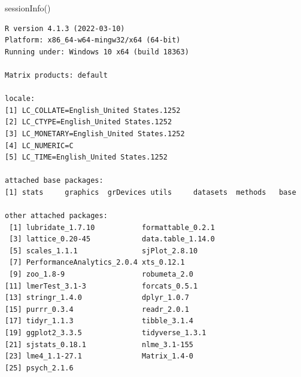\documentclass[
  11pt,
]{book}
\newenvironment{Shaded}{\begin{snugshade}}{\end{snugshade}}
\newcommand{\FunctionTok}[1]{\textcolor[rgb]{0.00,0.00,0.00}{#1}}
\newcommand{\NormalTok}[1]{#1}
\begin{document}
\begin{Shaded}
\begin{Highlighting}[]
\FunctionTok{sessionInfo}\NormalTok{()}
\end{Highlighting}
\end{Shaded}

\begin{verbatim}
R version 4.1.3 (2022-03-10)
Platform: x86_64-w64-mingw32/x64 (64-bit)
Running under: Windows 10 x64 (build 18363)

Matrix products: default

locale:
[1] LC_COLLATE=English_United States.1252 
[2] LC_CTYPE=English_United States.1252   
[3] LC_MONETARY=English_United States.1252
[4] LC_NUMERIC=C                          
[5] LC_TIME=English_United States.1252    

attached base packages:
[1] stats     graphics  grDevices utils     datasets  methods   base     

other attached packages:
 [1] lubridate_1.7.10           formattable_0.2.1         
 [3] lattice_0.20-45            data.table_1.14.0         
 [5] scales_1.1.1               sjPlot_2.8.10             
 [7] PerformanceAnalytics_2.0.4 xts_0.12.1                
 [9] zoo_1.8-9                  robumeta_2.0              
[11] lmerTest_3.1-3             forcats_0.5.1             
[13] stringr_1.4.0              dplyr_1.0.7               
[15] purrr_0.3.4                readr_2.0.1               
[17] tidyr_1.1.3                tibble_3.1.4              
[19] ggplot2_3.3.5              tidyverse_1.3.1           
[21] sjstats_0.18.1             nlme_3.1-155              
[23] lme4_1.1-27.1              Matrix_1.4-0              
[25] psych_2.1.6               


\end{verbatim}
\end{document}
